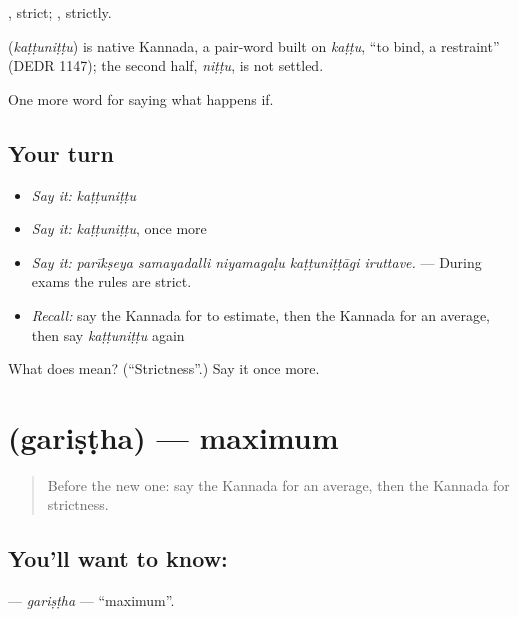 , strict; , strictly.

\begin{cousinweb}
\textbf{} (\emph{kaṭṭuniṭṭu}) is native Kannada, a pair-word built on \emph{kaṭṭu}, \textquotedblleft{}to bind, a restraint\textquotedblright{} (DEDR 1147); the second half, \emph{niṭṭu}, is not settled.
\end{cousinweb}

\begin{grammarlens}[title={What you've built}]
One more word for saying what happens if.
\end{grammarlens}

\subsection*{Your turn}
\begin{itemize}
\raggedright
  \item \emph{Say it:} \emph{kaṭṭuniṭṭu}
  \item \emph{Say it:} \emph{kaṭṭuniṭṭu}, once more
  \item \emph{Say it:} \emph{parīkṣeya samayadalli niyamagaḷu kaṭṭuniṭṭāgi iruttave.} — During exams the rules are strict.
  \item \emph{Recall:} say the Kannada for to estimate, then the Kannada for an average, then say \emph{kaṭṭuniṭṭu} again
\end{itemize}

\begin{tcolorbox}[breakable,colback=teal!4,colframe=teal!35!black,title={Before you move on}]
What does  mean? (\textquotedblleft{}Strictness\textquotedblright{}.) Say it once more.
\end{tcolorbox}
\section[\texorpdfstring{\kn{ಗರಿಷ್ಠ} (gariṣṭha)}{ಗರಿಷ್ಠ (gariṣṭha)}]{ (gariṣṭha) — maximum}

\label{lesson:KA-C414-garistha}



\begin{quote}
Before the new one: say the Kannada for an average, then the Kannada for strictness.
\end{quote}

\subsection*{You'll want to know: }
\textbf{} — \emph{gariṣṭha} — \textquotedblleft{}maximum\textquotedblright{}.

